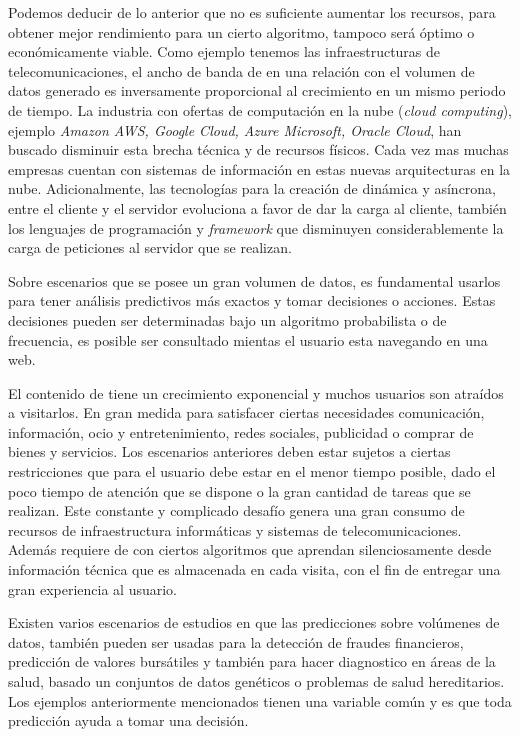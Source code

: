 
Podemos deducir de lo anterior que no es suficiente aumentar los recursos, para obtener  mejor rendimiento para un cierto algoritmo, tampoco será óptimo o económicamente viable. Como ejemplo tenemos las infraestructuras de telecomunicaciones, el ancho de banda de \inet en una relación con el volumen de datos generado es inversamente proporcional al crecimiento en un mismo periodo de tiempo. La industria con ofertas de computación en la nube (\emph{cloud computing}), ejemplo \emph{Amazon AWS, Google Cloud, Azure Microsoft, Oracle Cloud}, han buscado disminuir esta brecha técnica y de recursos físicos. Cada vez mas muchas empresas cuentan con sistemas de información en estas nuevas arquitecturas en la nube. Adicionalmente, las tecnologías para la creación de \www dinámica y asíncrona, entre el cliente y el servidor evoluciona a favor de dar la carga al cliente, también los lenguajes de programación y \emph{framework} que disminuyen considerablemente la carga de peticiones al servidor que se realizan.

Sobre escenarios que se posee un gran volumen de datos, es fundamental usarlos para tener análisis predictivos más exactos y tomar decisiones o acciones. Estas decisiones  pueden ser determinadas bajo un algoritmo probabilista o de frecuencia, es posible ser consultado  mientas el usuario esta navegando en una web. 

El contenido de \inet tiene un crecimiento exponencial y muchos usuarios son atraídos a visitarlos.  En gran medida para satisfacer ciertas necesidades comunicación, información, ocio y entretenimiento, redes sociales,  publicidad o  comprar de bienes y servicios. Los escenarios anteriores deben estar sujetos a ciertas restricciones que para el usuario debe estar en el menor tiempo posible, dado el poco tiempo de atención que se dispone o la gran cantidad de tareas que se realizan. Este constante y complicado desafío genera una gran consumo de recursos de infraestructura informáticas y sistemas de telecomunicaciones. Además  requiere de \webs con ciertos algoritmos que aprendan silenciosamente desde información técnica que es almacenada en cada visita, con el fin de entregar una gran experiencia al usuario.
 
Existen varios escenarios de estudios en que las predicciones sobre  volúmenes de datos, también pueden ser usadas para la {detección de fraudes financieros, predicción de valores bursátiles y también para hacer diagnostico en áreas de la salud, basado un conjuntos de datos genéticos o problemas de salud hereditarios. Los ejemplos anteriormente mencionados tienen una variable  común y es que toda predicción ayuda a tomar una decisión.}\label{ejemplos-casos-contextopreliminar}


